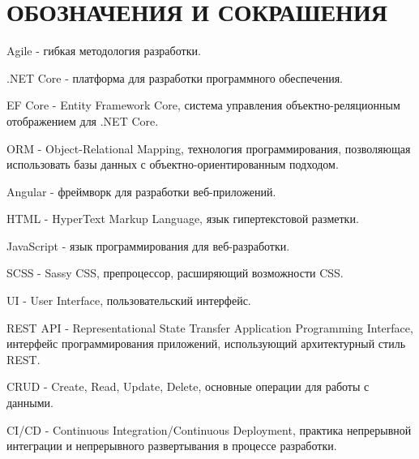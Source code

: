 \section*{ОБОЗНАЧЕНИЯ И СОКРАШЕНИЯ}

Agile -\- гибкая методология разработки.

.NET Core -\- платформа для разработки программного обеспечения.

EF Core -\- Entity Framework Core, система управления объектно-реляционным отображением для .NET Core.

ORM -\- Object-Relational Mapping, технология программирования, позволяющая использовать базы данных с объектно-ориентированным подходом.

Angular -\- фреймворк для разработки веб-приложений.

HTML -\- HyperText Markup Language, язык гипертекстовой разметки.

JavaScript -\- язык программирования для веб-разработки.

SCSS -\- Sassy CSS, препроцессор, расширяющий возможности CSS.

UI -\- User Interface, пользовательский интерфейс.

REST API -\- Representational State Transfer Application Programming Interface, интерфейс программирования приложений, использующий архитектурный стиль REST.

CRUD -\- Create, Read, Update, Delete, основные операции для работы с данными.

CI/CD -\- Continuous Integration/Continuous Deployment, практика непрерывной интеграции и непрерывного развертывания в процессе разработки.
